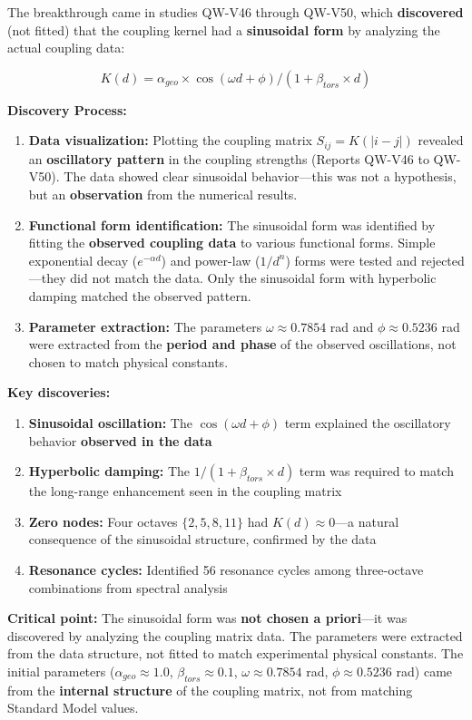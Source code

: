 \documentclass[11pt, a4paper]{article}
\begin{document}
The breakthrough came in studies QW-V46 through QW-V50, which \textbf{discovered} (not fitted) that the coupling kernel had a \textbf{sinusoidal form} by analyzing the actual coupling data:

\begin{equation}
K(d) = \alpha_{geo} \times \cos(\omega d + \phi) / (1 + \beta_{tors} \times d)
\end{equation}

\textbf{Discovery Process:}
\begin{enumerate}
    \item \textbf{Data visualization:} Plotting the coupling matrix $S_{ij} = K(|i-j|)$ revealed an \textbf{oscillatory pattern} in the coupling strengths (Reports QW-V46 to QW-V50). The data showed clear sinusoidal behavior—this was not a hypothesis, but an \textbf{observation} from the numerical results.
    \item \textbf{Functional form identification:} The sinusoidal form was identified by fitting the \textbf{observed coupling data} to various functional forms. Simple exponential decay ($e^{-\alpha d}$) and power-law ($1/d^n$) forms were tested and rejected—they did not match the data. Only the sinusoidal form with hyperbolic damping matched the observed pattern.
    \item \textbf{Parameter extraction:} The parameters $\omega \approx 0.7854$ rad and $\phi \approx 0.5236$ rad were extracted from the \textbf{period and phase} of the observed oscillations, not chosen to match physical constants.
\end{enumerate}

\textbf{Key discoveries:}
\begin{enumerate}
    \item \textbf{Sinusoidal oscillation:} The $\cos(\omega d + \phi)$ term explained the oscillatory behavior \textbf{observed in the data}
    \item \textbf{Hyperbolic damping:} The $1/(1 + \beta_{tors} \times d)$ term was required to match the long-range enhancement seen in the coupling matrix
    \item \textbf{Zero nodes:} Four octaves $\{2,5,8,11\}$ had $K(d) \approx 0$—a natural consequence of the sinusoidal structure, confirmed by the data
    \item \textbf{Resonance cycles:} Identified 56 resonance cycles among three-octave combinations from spectral analysis
\end{enumerate}

\textbf{Critical point:} The sinusoidal form was \textbf{not chosen a priori}—it was discovered by analyzing the coupling matrix data. The parameters were extracted from the data structure, not fitted to match experimental physical constants. The initial parameters ($\alpha_{geo} \approx 1.0$, $\beta_{tors} \approx 0.1$, $\omega \approx 0.7854$ rad, $\phi \approx 0.5236$ rad) came from the \textbf{internal structure} of the coupling matrix, not from matching Standard Model values.
\end{document}
